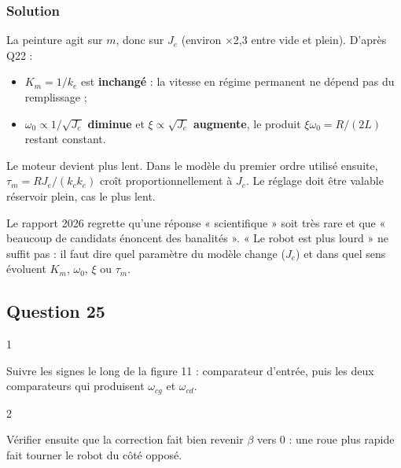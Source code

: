 \documentclass[11pt,a4paper]{article}
\providecommand{\tightlist}{\setlength{\itemsep}{0pt}\setlength{\parskip}{0pt}}
\begin{document}
\hypertarget{solution-23}{%
\subsubsection{Solution}\label{solution-23}}

La peinture agit sur \(m\), donc sur \(J_e\) (environ ×2,3 entre vide et plein). D'après Q22 :

\begin{itemize}
\tightlist
\item
  \(K_m = 1/k_e\) est \textbf{inchangé} : la vitesse en régime permanent ne dépend pas du remplissage ;
\item
  \(\omega_0 \propto 1/\sqrt{J_e}\) \textbf{diminue} et \(\xi \propto \sqrt{J_e}\) \textbf{augmente}, le produit \(\xi\omega_0 = R/(2L)\) restant constant.
\end{itemize}

Le moteur devient plus lent. Dans le modèle du premier ordre utilisé ensuite, \(\tau_m = RJ_e/(k_ck_e)\) croît proportionnellement à \(J_e\). Le réglage doit être valable réservoir plein, cas le plus lent.

\begin{jury}

Le rapport 2026 regrette qu'une réponse « scientifique » soit très rare et que « beaucoup de candidats énoncent des banalités ». « Le robot est plus lourd » ne suffit pas : il faut dire quel paramètre du modèle change (\(J_e\)) et dans quel sens évoluent \(K_m\), \(\omega_0\), \(\xi\) ou \(\tau_m\).

\end{jury}

\hypertarget{question-25}{%
\subsection{Question 25}\label{question-25}}

\begin{indication}{1}

Suivre les signes le long de la figure 11 : comparateur d'entrée, puis les deux comparateurs qui produisent \(\omega_{cg}\) et \(\omega_{cd}\).

\end{indication}

\begin{indication}{2}

Vérifier ensuite que la correction fait bien revenir \(\beta\) vers 0 : une roue plus rapide fait tourner le robot du côté opposé.

\end{indication}
\end{document}
